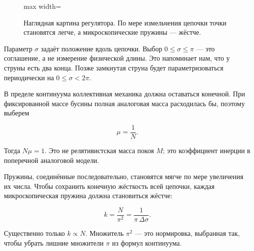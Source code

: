 \begin{figure}[H]
  \centering
  \begin{adjustbox}{max width=\linewidth}
  \end{adjustbox}
  \caption{Наглядная картина регулятора. По мере измельчения цепочки точки становятся легче, а микроскопические пружины — жёстче.}
  \label{fig:l02-chain-redraw}
\end{figure}

Параметр \(\sigma\) задаёт положение вдоль цепочки. Выбор
\(0\leq\sigma\leq\pi\) — это соглашение, а не измерение физической длины.
Это напоминает нам, что у струны есть два конца. Позже замкнутая струна будет
параметризоваться периодически на \(0\leq\sigma<2\pi\).

В пределе континуума коллективная механика должна оставаться конечной. При фиксированной массе бусины полная аналоговая масса расходилась бы, поэтому выберем

\begin{equation}
  \mu=\frac{1}{N}.
  \label{eq:l02-mu-scaling}
\end{equation}

Тогда \(N\mu=1\). Это не релятивистская масса покоя \(M\); это коэффициент
инерции в поперечной аналоговой модели.

Пружины, соединённые последовательно, становятся мягче по мере увеличения их
числа. Чтобы сохранить конечную жёсткость всей цепочки, каждая микроскопическая
пружина должна становиться жёстче:

\begin{equation}
  k=\frac{N}{\pi^2}
  =\frac{1}{\pi\,\Delta\sigma}.
  \label{eq:l02-k-scaling}
\end{equation}

Существенно только \(k\propto N\). Множитель \(\pi^2\) — это нормировка,
выбранная так, чтобы убрать лишние множители \(\pi\) из формул континуума.

